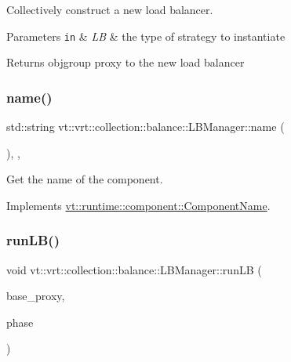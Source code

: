 Collectively construct a new load balancer. 


\begin{DoxyParams}[1]{Parameters}
\mbox{\tt in}  & {\em LB} & the type of strategy to instantiate\\
\hline
\end{DoxyParams}
\begin{DoxyReturn}{Returns}
objgroup proxy to the new load balancer 
\end{DoxyReturn}
\mbox{\label{structvt_1_1vrt_1_1collection_1_1balance_1_1_l_b_manager_a8e18e972cf9e8658da9577d45e090698}} 
\subsubsection{\texorpdfstring{name()}{name()}}
{\footnotesize\ttfamily std\+::string vt\+::vrt\+::collection\+::balance\+::\+L\+B\+Manager\+::name (\begin{DoxyParamCaption}{ }\end{DoxyParamCaption})\hspace{0.3cm}{\ttfamily [inline]}, {\ttfamily [override]}, {\ttfamily [virtual]}}



Get the name of the component. 



Implements \hyperlink{structvt_1_1runtime_1_1component_1_1_component_name_a33c06229bb605a2b2ceff68830d6d773}{vt\+::runtime\+::component\+::\+Component\+Name}.

\mbox{\label{structvt_1_1vrt_1_1collection_1_1balance_1_1_l_b_manager_a020cb9b702b65e1caee89994bdcb304e}} 
\subsubsection{\texorpdfstring{run\+L\+B()}{runLB()}}
{\footnotesize\ttfamily void vt\+::vrt\+::collection\+::balance\+::\+L\+B\+Manager\+::run\+LB (\begin{DoxyParamCaption}\item[{\hyperlink{structvt_1_1vrt_1_1collection_1_1balance_1_1_l_b_manager_a8b1a7735366beb85c2c2ccc3912cdd80}{L\+B\+Proxy\+Type}}]{base\+\_\+proxy,  }\item[{\hyperlink{namespacevt_a46ce6733d5cdbd735d561b7b4029f6d7}{Phase\+Type}}]{phase }\end{DoxyParamCaption})\hspace{0.3cm}{\ttfamily [protected]}}

